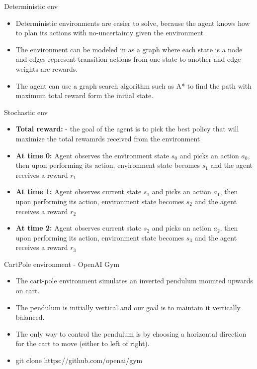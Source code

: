 \documentclass[10pt,mathserif]{beamer}
\begin{document}
\begin{frame}{Deterministic env}
\begin{itemize}
\item Deterministic environments are easier to solve, because the agent knows how to plan its actions with
no-uncertainty given the environment
\item The environment can be modeled in as a graph where each state is a node and edges represent transition actions from one state to another and edge weights are rewards.
\item The agent can use a graph search algorithm such as A* to find the path with maximum total reward form the initial state.
\end{itemize}
\end{frame}

\begin{frame}{Stochastic env}
\begin{itemize}
\item \textbf{Total reward:} - the goal of the agent is to pick the best policy that will maximize the total rewamrds received from the environment
\item \textbf{At time 0:} Agent observes the environment state $s_0$ and picks an action $a_0$, then upon performing its action, environment state becomes $s_1$ and the agent receives a reward $r_1$
\item \textbf{At time 1:} Agent observes current state $s_1$ and picks an action $a_1$, then upon performing its action, environment state becomes $s_2$ and the agent receives a reward $r_2$
\item \textbf{At time 2:} Agent observes current state $s_2$ and picks an action $a_2$, then upon performing its action, environment state becomes $s_3$ and the agent receives a reward $r_3$
\end{itemize}
\end{frame}


\begin{frame}{CartPole environment - OpenAI Gym}
\begin{itemize}
\item The cart-pole environment simulates an inverted pendulum mounted upwards on cart.
\item The pendulum is initially vertical and our goal is to maintain it vertically balanced.
\item The only way to control the pendulum is by choosing a horizontal direction for the cart to move (either
to left of right).
\item git clone https://github.com/openai/gym
\end{itemize}
\end{frame}
\end{document}
